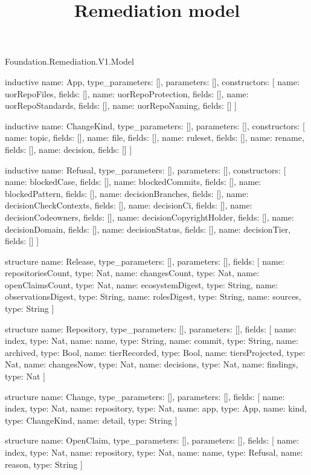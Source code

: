 \begin{lexlean}{Foundation.Remediation.V1.Model}
\title{Remediation model}
\begin{semanticmodule}
inductive{
  name: App,
  type_parameters: [],
  parameters: [],
  constructors: [
    {name: uorRepoFiles, fields: []},
    {name: uorRepoProtection, fields: []},
    {name: uorRepoStandards, fields: []},
    {name: uorRepoNaming, fields: []}
  ]
}

inductive{
  name: ChangeKind,
  type_parameters: [],
  parameters: [],
  constructors: [
    {name: topic, fields: []},
    {name: file, fields: []},
    {name: ruleset, fields: []},
    {name: rename, fields: []},
    {name: decision, fields: []}
  ]
}

inductive{
  name: Refusal,
  type_parameters: [],
  parameters: [],
  constructors: [
    {name: blockedCase, fields: []},
    {name: blockedCommits, fields: []},
    {name: blockedPattern, fields: []},
    {name: decisionBranches, fields: []},
    {name: decisionCheckContexts, fields: []},
    {name: decisionCi, fields: []},
    {name: decisionCodeowners, fields: []},
    {name: decisionCopyrightHolder, fields: []},
    {name: decisionDomain, fields: []},
    {name: decisionStatus, fields: []},
    {name: decisionTier, fields: []}
  ]
}

structure{
  name: Release,
  type_parameters: [],
  parameters: [],
  fields: [
    {name: repositoriesCount, type: Nat},
    {name: changesCount, type: Nat},
    {name: openClaimsCount, type: Nat},
    {name: ecosystemDigest, type: String},
    {name: observationsDigest, type: String},
    {name: rolesDigest, type: String},
    {name: sources, type: String}
  ]
}

structure{
  name: Repository,
  type_parameters: [],
  parameters: [],
  fields: [
    {name: index, type: Nat},
    {name: name, type: String},
    {name: commit, type: String},
    {name: archived, type: Bool},
    {name: tierRecorded, type: Bool},
    {name: tiersProjected, type: Nat},
    {name: changesNow, type: Nat},
    {name: decisions, type: Nat},
    {name: findings, type: Nat}
  ]
}

structure{
  name: Change,
  type_parameters: [],
  parameters: [],
  fields: [
    {name: index, type: Nat},
    {name: repository, type: Nat},
    {name: app, type: App},
    {name: kind, type: ChangeKind},
    {name: detail, type: String}
  ]
}

structure{
  name: OpenClaim,
  type_parameters: [],
  parameters: [],
  fields: [
    {name: index, type: Nat},
    {name: repository, type: Nat},
    {name: name, type: Refusal},
    {name: reason, type: String}
  ]
}


\end{semanticmodule}
\end{lexlean}
